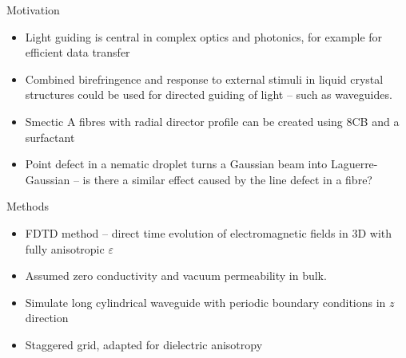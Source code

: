 \documentclass{beamer}
\newlength{\wideitemsep}
\let\olditem\item
\renewcommand{\item}{\setlength{\itemsep}{\wideitemsep}\olditem}
\newcommand{\blockpadding}{
  \rule[-0.6ex]{0pt}{2.5ex}
}
\begin{document}
\begin{columns}[t]
 \begin{column}{.36\textwidth}
\begin{block}{\blockpadding Motivation}
\begin{itemize}
 \item Light guiding is central in complex optics and photonics, for example for efficient data transfer
 \item Combined birefringence and response to external stimuli in liquid crystal structures could be used for directed guiding of light -- such as waveguides.
 \item Smectic A fibres with radial director profile can be created using 8CB and a surfactant\cite{musevic-nekej}
 \item Point defect in a nematic droplet turns a Gaussian beam into Laguerre-Gaussian -- is there a similar effect caused by the line defect in a fibre?
\end{itemize}
\end{block}

\begin{block}{\blockpadding Methods}
 \begin{itemize}
  \item FDTD method -- direct time evolution of electromagnetic fields in 3D with fully anisotropic $\varepsilon$
  \item Assumed zero conductivity and vacuum permeability in bulk. 
  \item Simulate long cylindrical waveguide with periodic boundary conditions in $z$ direction
  \item Staggered grid, adapted for dielectric anisotropy
  \begin{figure}[h]
\centering
\end{figure}
\end{itemize}
\end{block}
\end{column}
\end{columns}
\end{document}
